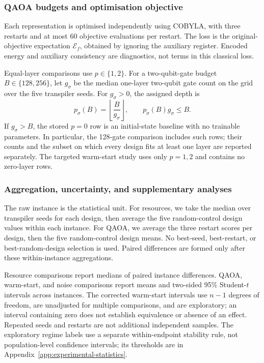 \documentclass[a4paper,onecolumn,11pt,unpublished]{quantumarticle}
\theoremstyle{remark}
\begin{document}
\subsubsection{QAOA budgets and optimisation objective}
\label{sec:qaoa-evaluation}

Each representation is optimised independently using COBYLA, with three
restarts and at most 60 objective evaluations per restart. The loss is the
original-objective expectation $\mathcal E_f$, obtained by ignoring the
auxiliary register. Encoded energy and auxiliary consistency are diagnostics,
not terms in this classical loss.

Equal-layer comparisons use $p\in\{1,2\}$. For a two-qubit-gate budget
$B\in\{128,256\}$, let $g_\sigma$ be the median one-layer two-qubit gate
count on the grid over the five transpiler seeds. For $g_\sigma>0$, the
assigned depth is
\begin{equation}
 p_\sigma(B)=\left\lfloor\frac{B}{g_\sigma}\right\rfloor,
 \qquad p_\sigma(B)g_\sigma\leq B.
 \label{eq:qaoa-gate-budget-depth}
\end{equation}
If $g_\sigma>B$, the stored $p=0$ row is an initial-state baseline with no
trainable parameters. In particular, the 128-gate comparison includes such
rows; their counts and the subset on which every design fits at least one
layer are reported separately. The targeted warm-start study uses only
$p=1,2$ and contains no zero-layer rows.

\subsubsection{Aggregation, uncertainty, and supplementary analyses}
\label{sec:structure-noise-protocol}

The raw instance is the statistical unit. For resources, we take the median
over transpiler seeds for each design, then average the five random-control
design values within each instance. For QAOA, we average the three restart
scores per design, then the five random-control design means. No best-seed,
best-restart, or best-random-design selection is used. Paired differences are
formed only after these within-instance aggregations.

Resource comparisons report medians of paired instance differences. QAOA,
warm-start, and noise comparisons report means and two-sided 95\%
Student-$t$ intervals across instances. The corrected warm-start intervals
use $n-1$ degrees of freedom, are unadjusted for multiple comparisons,
and are exploratory; an interval containing zero does not establish
equivalence or absence of an effect. Repeated seeds and restarts are not
additional independent samples. The exploratory regime labels use a separate
within-endpoint stability rule, not population-level confidence intervals;
its thresholds are in Appendix~\ref{app:experimental-statistics}.
\end{document}
